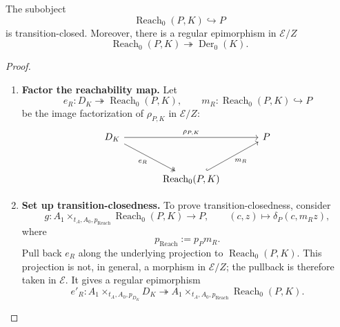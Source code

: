 \begin{proposition}
\label{prop:reachable-part}
    The subobject
    \[
        \operatorname{Reach}_0(P,K)\hookrightarrow P
    \]
    is transition-closed. Moreover, there is a regular epimorphism in
    \(\mathcal E/Z\)
    \[
        \operatorname{Reach}_0(P,K)
        \twoheadrightarrow
        \operatorname{Der}_0(K).
    \]
\end{proposition}
\begin{proof}
    \leavevmode
    \begin{enumerate}
        \item \textbf{Factor the reachability map.} Let
        \[
            e_R:D_K\twoheadrightarrow \operatorname{Reach}_0(P,K),
            \qquad
            m_R:\operatorname{Reach}_0(P,K)\hookrightarrow P
        \]
        be the image factorization of \(\rho_{P,K}\) in \(\mathcal E/Z\):
        \[
            \begin{tikzcd}[column sep=large, row sep=large]
                    D_K
                        \arrow[rr, "\rho_{P,K}"]
                        \arrow[dr, two heads, "e_R"']
                &
                &
                    P
                \\
                &
                    \operatorname{Reach}_0(P,K)
                        \arrow[ur, hook, "m_R"']
                &
            \end{tikzcd}
        \]

        \item \textbf{Set up transition-closedness.} To prove transition-closedness, consider
        \[
            g:
            A_1\times_{t_A,A_0,p_{\operatorname{Reach}}}
                \operatorname{Reach}_0(P,K)
            \to P,
            \qquad
            (c,z)\longmapsto\delta_P(c,m_Rz),
        \]
        where
        \[
            p_{\operatorname{Reach}}:=p_Pm_R.
        \]
        Pull back \(e_R\) along the underlying projection to \(\operatorname{Reach}_0(P,K)\). This projection is not, in general, a morphism in \(\mathcal E/Z\); the pullback is therefore taken in \(\mathcal E\). It gives a regular epimorphism
        \[
            e'_R:
            A_1\times_{t_A,A_0,p_{D_K}}D_K
            \twoheadrightarrow
            A_1\times_{t_A,A_0,p_{\operatorname{Reach}}}
                \operatorname{Reach}_0(P,K).
        \]


\end{enumerate}
\end{proof}
